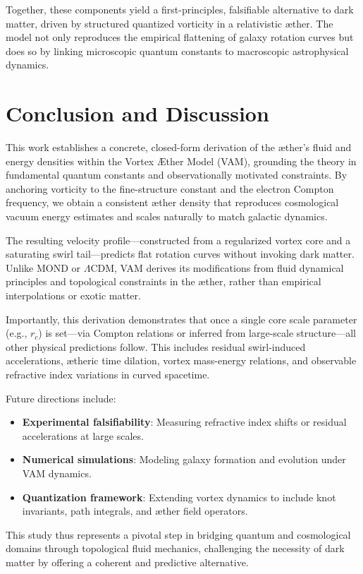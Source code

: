 \documentclass[12pt]{article}
\begin{document}
Together, these components yield a first-principles, falsifiable alternative to dark matter, driven by structured quantized vorticity in a relativistic æther. The model not only reproduces the empirical flattening of galaxy rotation curves but does so by linking microscopic quantum constants to macroscopic astrophysical dynamics.

\section{Conclusion and Discussion}

This work establishes a concrete, closed-form derivation of the æther’s fluid and energy densities within the Vortex \AE{}ther Model (VAM), grounding the theory in fundamental quantum constants and observationally motivated constraints. By anchoring vorticity to the fine-structure constant and the electron Compton frequency, we obtain a consistent æther density that reproduces cosmological vacuum energy estimates and scales naturally to match galactic dynamics.

The resulting velocity profile—constructed from a regularized vortex core and a saturating swirl tail—predicts flat rotation curves without invoking dark matter. Unlike MOND or $\Lambda$CDM, VAM derives its modifications from fluid dynamical principles and topological constraints in the æther, rather than empirical interpolations or exotic matter.

Importantly, this derivation demonstrates that once a single core scale parameter (e.g., \( r_c \)) is set—via Compton relations or inferred from large-scale structure—all other physical predictions follow. This includes residual swirl-induced accelerations, ætheric time dilation, vortex mass-energy relations, and observable refractive index variations in curved spacetime.

Future directions include:
\begin{itemize}
    \item \textbf{Experimental falsifiability}: Measuring refractive index shifts or residual accelerations at large scales.
    \item \textbf{Numerical simulations}: Modeling galaxy formation and evolution under VAM dynamics.
    \item \textbf{Quantization framework}: Extending vortex dynamics to include knot invariants, path integrals, and æther field operators.
\end{itemize}

This study thus represents a pivotal step in bridging quantum and cosmological domains through topological fluid mechanics, challenging the necessity of dark matter by offering a coherent and predictive alternative.







\ifdefined\standalonechapter\else


\end{document}
